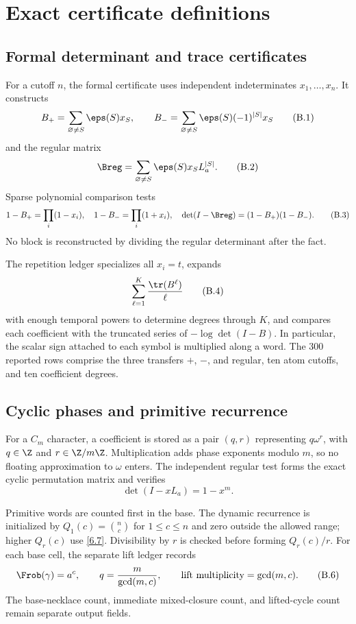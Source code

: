 \section{Exact certificate definitions}
\label{app:certificates}

\subsection{Formal determinant and trace certificates}

For a cutoff \(n\), the formal certificate uses independent indeterminates
\(x_1,\ldots,x_n\).  It constructs
\[
B_+=\sum_{\varnothing\ne S}\eps(S)x_S,\qquad
B_-=\sum_{\varnothing\ne S}\eps(S)(-1)^{|S|}x_S
\tag{B.1}\label{B.1}
\]
and the regular matrix
\[
\Breg=\sum_{\varnothing\ne S}\eps(S)x_SL_a^{|S|}.
\tag{B.2}\label{B.2}
\]
Sparse polynomial comparison tests
\[
1-B_+=\prod_i(1-x_i),\quad
1-B_-=\prod_i(1+x_i),\quad
\det(I-\Breg)=(1-B_+)(1-B_-).
\tag{B.3}\label{B.3}
\]
No block is reconstructed by dividing the regular determinant after the fact.

The repetition ledger specializes all \(x_i=t\), expands
\[
\sum_{\ell=1}^{K}\frac{\tr(B^\ell)}{\ell}
\tag{B.4}\label{B.4}
\]
with enough temporal powers to determine degrees through \(K\), and compares
each coefficient with the truncated series of
\(-\log\det(I-B)\).  In particular, the scalar sign attached to each symbol
is multiplied along a word.  The 300 reported rows comprise the three
transfers \(+\), \(-\), and regular, ten atom cutoffs, and ten coefficient
degrees.

\subsection{Cyclic phases and primitive recurrence}

For a \(C_m\) character, a coefficient is stored as a pair
\((q,r)\) representing \(q\omega^r\), with \(q\in\Z\) and
\(r\in\Z/m\Z\).  Multiplication adds phase exponents modulo \(m\), so no
floating approximation to \(\omega\) enters.  The independent regular test
forms the exact cyclic permutation matrix and verifies
\[
\det(I-xL_a)=1-x^m.
\tag{B.5}\label{B.5}
\]

Primitive words are counted first in the base.  The dynamic recurrence is
initialized by \(Q_1(c)=\binom nc\) for \(1\le c\le n\) and zero outside the
allowed range; higher \(Q_r(c)\) use \eqref{6.7}.  Divisibility by \(r\) is
checked before forming \(Q_r(c)/r\).  For each base cell, the separate lift
ledger records
\[
\Frob(\gamma)=a^c,\qquad
q=\frac{m}{\gcd(m,c)},\qquad
\text{lift multiplicity}=\gcd(m,c).
\tag{B.6}\label{B.6}
\]
The base-necklace count, immediate mixed-closure count, and lifted-cycle
count remain separate output fields.

